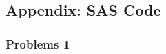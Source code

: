 \documentclass[11pt]{article}
\begin{document}
\begin{enumerate}
\end{enumerate}

\pagebreak
\subsection*{Appendix: SAS Code}

\subsubsection*{Problems 1}

\footnotesize
\end{document}
